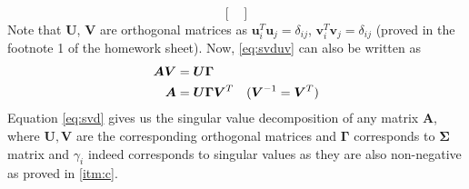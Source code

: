 \documentclass[a4paper]{article}
\begin{document}
\begin{enumerate}[(a)]
\begin{equation}
\begin{bmatrix}
		\end{bmatrix}
	\end{equation}
	Note that $\bm{U}$, $\bm{V}$ are orthogonal matrices as $\bm{u}_i^T\bm{u}_j=\delta_{ij}$, $\bm{v}_i^T\bm{v}_j=\delta_{ij}$ (proved in the footnote 1 of the homework sheet).
	Now, \ref{eq:svduv} can also be written as
	\begin{equation}{\label{eq:svd}}
		\begin{aligned}
			\bm{A}\bm{V}&=\bm{U}\bm{\Gamma}\\
			\bm{A}&=\bm{U}\bm{\Gamma}\bm{V}^T&\hfill{(\bm{V}^{-1}=\bm{V}^T)}
		\end{aligned}
	\end{equation}
	Equation \ref{eq:svd} gives us the singular value decomposition of any matrix $\bm{A}$, where $\bm{U}, \bm{V}$ are the corresponding orthogonal matrices and $\bm{\Gamma}$ corresponds to $\bm{\Sigma}$ matrix and $\gamma_i$ indeed corresponds to singular values as they are also non-negative as proved in \ref{itm:c}.
\end{enumerate}
\end{document}
